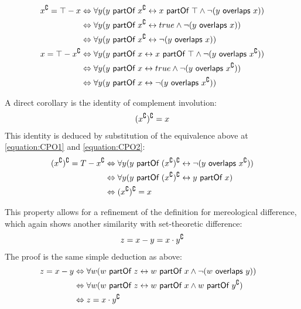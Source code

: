 \begin{align}
\begin{split}
x^{\complement} = \top - x
&\Leftrightarrow
\forall y(y ~\textsf{partOf}~ x^{\complement} \leftrightarrow x ~\textsf{partOf}~ \top \wedge \neg(y ~\textsf{overlaps}~ x))
\\&\Leftrightarrow
\forall y(y ~\textsf{partOf}~ x^{\complement} \leftrightarrow true \wedge \neg(y ~\textsf{overlaps}~ x))
\\&\Leftrightarrow
\forall y(y ~\textsf{partOf}~ x^{\complement} \leftrightarrow \neg(y ~\textsf{overlaps}~ x))
\end{split}
\label{equation:CPO1}
\\
\begin{split}
x = \top - x^{\complement} 
&\Leftrightarrow
\forall y(y ~\textsf{partOf}~ x \leftrightarrow x ~\textsf{partOf}~ \top \wedge \neg(y ~\textsf{overlaps}~ x^{\complement} ))
\\&\Leftrightarrow
\forall y(y ~\textsf{partOf}~ x \leftrightarrow true \wedge \neg(y ~\textsf{overlaps}~ x^{\complement} ))
\\&\Leftrightarrow
\forall y(y ~\textsf{partOf}~ x \leftrightarrow \neg(y ~\textsf{overlaps}~ x^{\complement} ))
\end{split}
\label{equation:CPO2}
\end{align}

A direct corollary is the identity of complement involution:
\begin{align}
(x^{\complement})^{\complement} = x
\end{align}
This identity is deduced by substitution of the equivalence above at \ref{equation:CPO1} and \ref{equation:CPO2}:
\begin{align}
\begin{split}
(x^{\complement})^{\complement} = T - x^{\complement}
&\Leftrightarrow
\forall y (y ~\textsf{partOf}~ (x^{\complement})^{\complement} \leftrightarrow \neg(y ~\textsf{overlaps}~ x^{\complement}))
\\&\Leftrightarrow
\forall y (y ~\textsf{partOf}~ (x^{\complement})^{\complement} \leftrightarrow y ~\textsf{partOf}~ x)
\\&\Leftrightarrow
(x^{\complement})^{\complement} = x
\end{split}
\end{align}

This property allows for a refinement of the definition for mereological difference, which again shows another similarity with set-theoretic difference:
\begin{align}
z = x - y = x \cdot y^{\complement}
\end{align}
The proof is the same simple deduction as above:
\begin{align}
&\begin{split}
z = x - y
&\Leftrightarrow
\forall w (w ~\textsf{partOf}~ z \leftrightarrow w ~\textsf{partOf}~ x \wedge \neg (w ~\textsf{overlaps}~ y))
\\&\Leftrightarrow
\forall w (w ~\textsf{partOf}~ z \leftrightarrow w ~\textsf{partOf}~ x \wedge w ~\textsf{partOf}~ y^{\complement})
\\&\Leftrightarrow
z = x \cdot y^{\complement}
\end{split}
\end{align}


